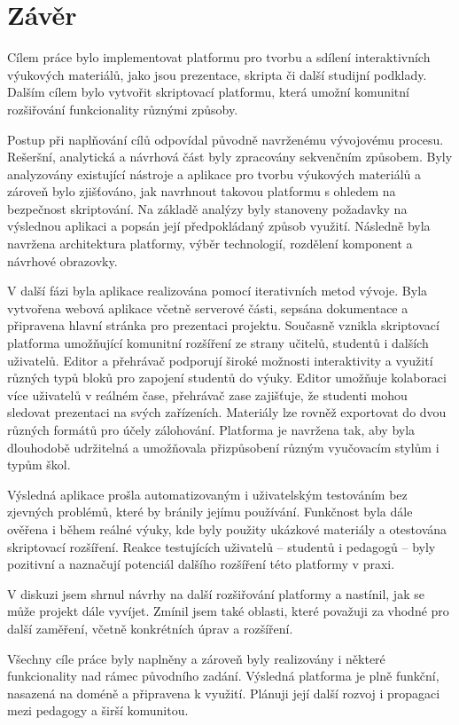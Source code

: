 \chapter*{Závěr}


Cílem práce bylo implementovat platformu pro tvorbu a sdílení interaktivních výukových materiálů, jako jsou prezentace, skripta či další studijní podklady. 
Dalším cílem bylo vytvořit skriptovací platformu, která umožní komunitní rozšiřování funkcionality různými způsoby.

Postup při naplňování cílů odpovídal původně navrženému vývojovému procesu. Rešeršní, analytická a návrhová část byly zpracovány sekvenčním způsobem. 
Byly analyzovány existující nástroje a aplikace pro tvorbu výukových materiálů a zároveň bylo zjišťováno, jak navrhnout takovou platformu s ohledem na bezpečnost skriptování.
Na základě analýzy byly stanoveny požadavky na výslednou aplikaci a popsán její předpokládaný způsob využití. 
Následně byla navržena architektura platformy, výběr technologií, rozdělení komponent a návrhové obrazovky.

V další fázi byla aplikace realizována pomocí iterativních metod vývoje.
Byla vytvořena webová aplikace včetně serverové části, sepsána dokumentace a připravena hlavní stránka pro prezentaci projektu.
Současně vznikla skriptovací platforma umožňující komunitní rozšíření ze strany učitelů, studentů i dalších uživatelů.
Editor a přehrávač podporují široké možnosti interaktivity a využití různých typů bloků pro zapojení studentů do výuky. 
Editor umožňuje kolaboraci více uživatelů v reálném čase, přehrávač zase zajišťuje, že studenti mohou sledovat prezentaci na svých zařízeních.
Materiály lze rovněž exportovat do dvou různých formátů pro účely zálohování. Platforma je navržena tak, aby byla dlouhodobě udržitelná a umožňovala přizpůsobení různým vyučovacím stylům i typům škol.

Výsledná aplikace prošla automatizovaným i uživatelským testováním bez zjevných problémů, které by bránily jejímu používání. 
Funkčnost byla dále ověřena i během reálné výuky, kde byly použity ukázkové materiály a otestována skriptovací rozšíření. 
Reakce testujících uživatelů -- studentů i pedagogů -- byly pozitivní a naznačují potenciál dalšího rozšíření této platformy v praxi.

V diskuzi jsem shrnul návrhy na další rozšiřování platformy a nastínil, jak se může projekt dále vyvíjet. 
Zmínil jsem také oblasti, které považuji za vhodné pro další zaměření, včetně konkrétních úprav a rozšíření. 

Všechny cíle práce byly naplněny a zároveň byly realizovány i některé funkcionality nad rámec původního zadání. 
Výsledná platforma je plně funkční, nasazená na doméně a připravena k využití. 
Plánuji její další rozvoj i propagaci mezi pedagogy a širší komunitou.
